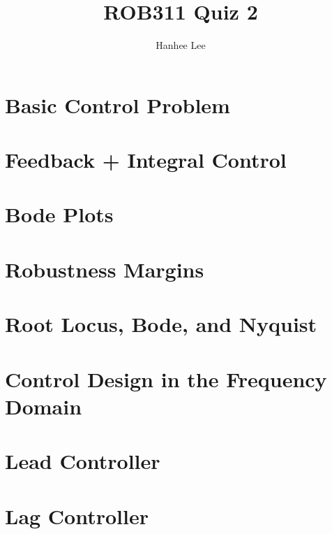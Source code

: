 \documentclass{article}
\title{ROB311 Quiz 2}
\author{Hanhee Lee}
\begin{document}
\maketitle

\tableofcontents
\newpage

\section{Basic Control Problem}

\newpage

\section{Feedback + Integral Control}

\newpage

\section{Bode Plots}

\newpage

\section{Robustness Margins}

\newpage

\section{Root Locus, Bode, and Nyquist}

\newpage

\section{Control Design in the Frequency Domain}

\newpage

\section{Lead Controller}

\newpage

\section{Lag Controller}

\newpage
\end{document}
